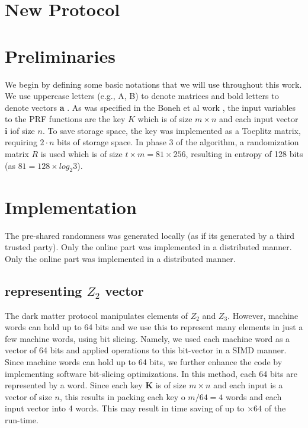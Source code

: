 \section{New Protocol}




\section{Preliminaries}
We begin by defining some basic notations that we will use throughout this work. We use uppercase letters (e.g.,
A, B) to denote matrices and bold letters to denote vectors \textbf{a} . As was specified in the Boneh et al work \cite{darkmatter}, the input variables to the PRF functions are the key ${K}$ which is of size $m \times n$ and each input vector $\textbf{i}$ iof size $n$. 
To save storage space, the key was implemented as a Toeplitz matrix, requiring $2 \cdot n$ bits of storage space.
In phase 3 of the algorithm, a randomization matrix $R$ is used which is of size $t \times m = 81 \times 256$, resulting in entropy of 128 bits (as $81 = 128 \times log_2 3$).


\section{Implementation}
\label{sec:technical_overview}

The pre-shared randomness was generated locally (as if its generated by a third trusted party). Only the online part was implemented in a distributed manner. Only the online part was implemented in a distributed manner.



\subsection{representing $Z_2$ vector}

The dark matter protocol manipulates elements of $Z_2$ and $Z_3$. However, machine words can hold up to 64 bits and we use this to represent many elements in just a few machine words, using bit slicing. Namely, we used each machine word as a vector of 64 bits and applied operations to this bit-vector in a SIMD manner.
Since machine words can hold up to 64 bits, we further enhance the code by implementing software bit-slicing optimizations. In this method, each 64 bits are represented by a word. Since each key $\textbf{K}$  is of size $m \times n$ and each input is a vector of size $n$, this results in packing each key o $m/64 = 4$ words and each input vector into 4 words. This may result in time saving of up to $\times 64$ of the run-time.

